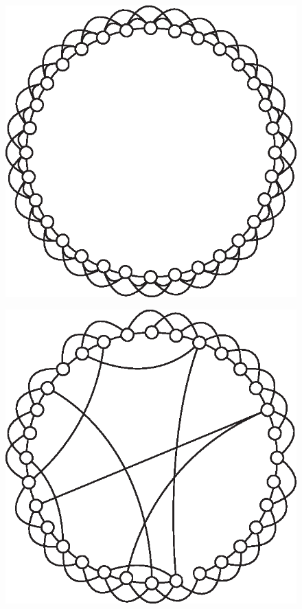       \begin{figure}[H]
        \centering
        \begin{minipage}[b]{0.48\textwidth}
          \centering
          \includegraphics[width=\textwidth]{chapters/02_problem_definition/lattice}
          \label{fig:lattice}
        \end{minipage}
        \quad
        \begin{minipage}[b]{0.48\textwidth}
          \centering
          \includegraphics[width=\textwidth]{chapters/02_problem_definition/smallworld}
          \label{fig:smallworld}
        \end{minipage}
      \end{figure}

